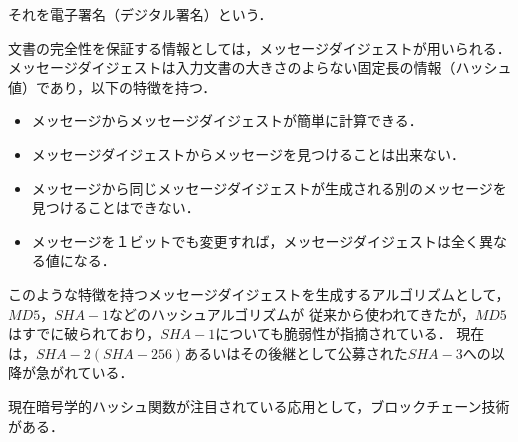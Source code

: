 \documentclass[a4paper,12pt]{jsarticle}
\begin{document}
それを電子署名（デジタル署名）という．

文書の完全性を保証する情報としては，メッセージダイジェストが用いられる．
メッセージダイジェストは入力文書の大きさのよらない固定長の情報（ハッシュ値）であり，以下の特徴を持つ．

\begin{itemize}
  \item メッセージからメッセージダイジェストが簡単に計算できる．
  \item メッセージダイジェストからメッセージを見つけることは出来ない．
  \item メッセージから同じメッセージダイジェストが生成される別のメッセージを見つけることはできない．
  \item メッセージを１ビットでも変更すれば，メッセージダイジェストは全く異なる値になる．
\end{itemize}

このような特徴を持つメッセージダイジェストを生成するアルゴリズムとして，$MD5$，$SHA-1$などのハッシュアルゴリズムが
従来から使われてきたが，$MD5$はすでに破られており，$SHA-1$についても脆弱性が指摘されている．
現在は，$SHA-2(SHA-256)$あるいはその後継として公募された$SHA-3$への以降が急がれている．

現在暗号学的ハッシュ関数が注目されている応用として，ブロックチェーン技術がある．


\end{document}
